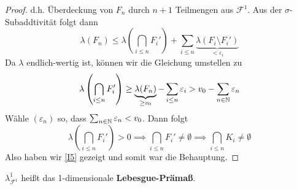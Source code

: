 \begin{satz}
\begin{proof}
d.h. Überdeckung von $F_n$ durch $n+1$ Teilmengen aus $\mathcal{F}^1$. Aus der $\sigma$-Subaddtivität folgt dann
$$
\lambda (F_n) \leq \lambda \left( \bigcap_{i\leq n} F_i' \right) + \sum_{i \leq n} \underbrace{\lambda (F_i \setminus F_i')}_{< \varepsilon_i}
$$
Da $\lambda$ endlich-wertig ist, können wir die Gleichung umstellen zu
$$
\lambda\left( \bigcap_{i \leq n} F_i' \right) \geq \underbrace{\lambda(F_n)}_{\geq v_0} - \sum_{i \leq n} \varepsilon_i > v_0 - \sum_{n \in \mathbb{N}} \varepsilon_n
$$
Wähle $(\varepsilon_n)$ so, dass $\sum_{n\in \mathbb{N}} \varepsilon_n < v_0$. Dann folgt
$$\lambda \left( \bigcap_{i \leq n } F_i' \right) > 0 \implies \bigcap_{i \leq n} F_i' \neq \emptyset \implies \bigcap_{i \leq n }K_i \neq \emptyset $$
Also haben wir \eqref{I5} gezeigt und somit war die Behauptung.
\end{proof}

\begin{definition}
\begin{mdframed}
$\lambda^1_{\mathcal{F}^1}$ heißt das 1-dimensionale \textbf{Lebesgue-Prämaß}.
\end{mdframed}
\end{definition}
\end{satz}

